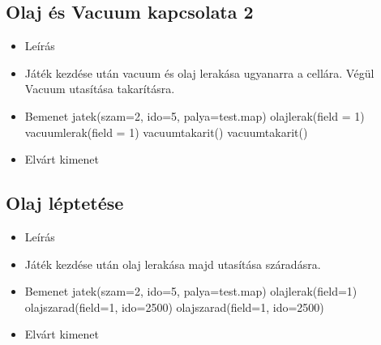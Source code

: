 \subsection{Olaj és Vacuum kapcsolata 2}
\begin{itemize}
	\item Leírás\newline
	\item Játék kezdése után vacuum és olaj lerakása ugyanarra a cellára. Végül Vacuum utasítása takarításra.
		\item Bemenet\newline
		jatek(szam=2, ido=5, palya=test.map) \newline
		olajlerak(field = 1) \newline
		vacuumlerak(field = 1) \newline
		vacuumtakarit() \newline
		vacuumtakarit() \newline		
	\item Elvárt kimenet\newline
\end{itemize}

\subsection{Olaj léptetése}
\begin{itemize}
	\item Leírás\newline
	\item Játék kezdése után olaj lerakása majd utasítása száradásra.
	\item Bemenet\newline
		jatek(szam=2, ido=5, palya=test.map) \newline
		olajlerak(field=1) \newline
		olajszarad(field=1, ido=2500) \newline
		olajszarad(field=1, ido=2500) \newline				
	\item Elvárt kimenet\newline
\end{itemize}

